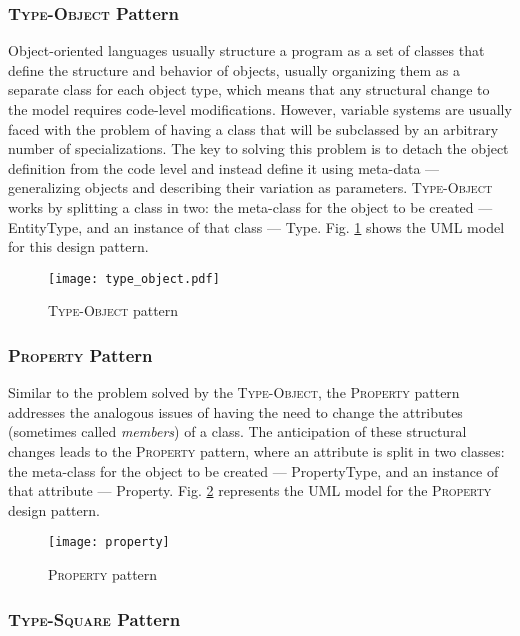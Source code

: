 \subsubsection{\textsc{Type-Object} Pattern}\label{sec:type-object_pattern}

Object-oriented languages usually structure a program as a set of classes that define the structure and behavior of objects, usually organizing them as a separate class for each object type, which means that any structural change to the model requires code-level modifications. However, variable systems are usually faced with the problem of having a class that will be subclassed by an arbitrary number of specializations. The key to solving this problem is to detach the object definition from the code level and instead define it using meta-data --- generalizing objects and describing their variation as parameters. \textsc{Type-Object} works by splitting a class in two: the meta-class for the object to be created --- EntityType, and an instance of that class --- Type. Fig. \ref{fig:type-object_pattern} shows the UML model for this design pattern.

\begin{figure}[H]
  \centering
  \texttt{[image: type\_object.pdf]}
  \caption{\textsc{Type-Object} pattern}
  \label{fig:type-object_pattern}
\end{figure}

\subsubsection{\textsc{Property} Pattern}\label{sec:property_pattern}

Similar to the problem solved by the \textsc{Type-Object}, the \textsc{Property} pattern addresses the analogous issues of having the need to change the attributes (sometimes called \emph{members}) of a class. The anticipation of these structural changes leads to the \textsc{Property} pattern, where an attribute is split in two classes: the meta-class for the object to be created --- PropertyType, and an instance of that attribute --- Property. Fig. \ref{fig:property_pattern} represents the UML model for the \textsc{Property} design pattern.

\begin{figure}[H]
  \centering
  \texttt{[image: property]}
  \caption{\textsc{Property} pattern}
  \label{fig:property_pattern}
\end{figure}

\subsubsection{\textsc{Type-Square} Pattern}\label{sec:type-square_pattern}

